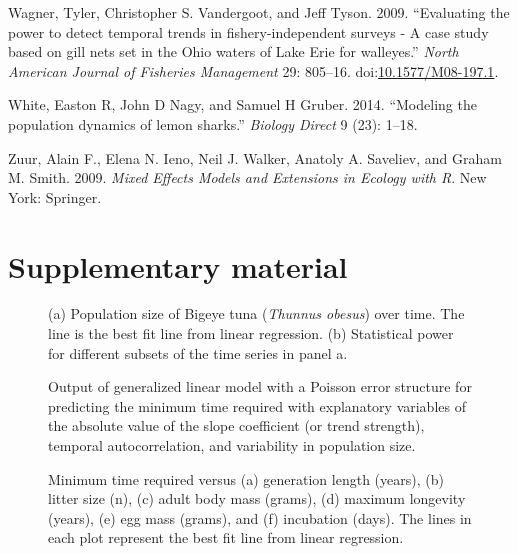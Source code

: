 \documentclass[12pt,]{article}
\begin{document}
\hypertarget{ref-Wagner2009}{}
Wagner, Tyler, Christopher S. Vandergoot, and Jeff Tyson. 2009.
``Evaluating the power to detect temporal trends in fishery-independent
surveys - A case study based on gill nets set in the Ohio waters of Lake
Erie for walleyes.'' \emph{North American Journal of Fisheries
Management} 29: 805--16.
doi:\href{https://doi.org/10.1577/M08-197.1}{10.1577/M08-197.1}.

\hypertarget{ref-White2014}{}
White, Easton R, John D Nagy, and Samuel H Gruber. 2014. ``Modeling the
population dynamics of lemon sharks.'' \emph{Biology Direct} 9 (23):
1--18.

\hypertarget{ref-Zuur2009}{}
Zuur, Alain F., Elena N. Ieno, Neil J. Walker, Anatoly A. Saveliev, and
Graham M. Smith. 2009. \emph{Mixed Effects Models and Extensions in
Ecology with R}. New York: Springer.

\clearpage

\section{Supplementary material}\label{supplementary-material}

\setcounter{figure}{0} \renewcommand{\thefigure}{A\arabic{figure}}

\begin{figure}[htbp]
\centering
\caption{(a) Population size of Bigeye tuna (\emph{Thunnus obesus}) over
time. The line is the best fit line from linear regression. (b)
Statistical power for different subsets of the time series in panel
a.\label{fig:empirical_approach_example}}
\end{figure}

\begin{figure}[htbp]
\centering
\caption{Output of generalized linear model with a Poisson error
structure for predicting the minimum time required with explanatory
variables of the absolute value of the slope coefficient (or trend
strength), temporal autocorrelation, and variability in population
size.\label{fig:poisson_model}}
\end{figure}

\begin{figure}[htbp]
\centering
\caption{Minimum time required versus (a) generation length (years), (b)
litter size (n), (c) adult body mass (grams), (d) maximum longevity
(years), (e) egg mass (grams), and (f) incubation (days). The lines in
each plot represent the best fit line from linear
regression.\label{fig:biological_correlates}}
\end{figure}
\end{document}
